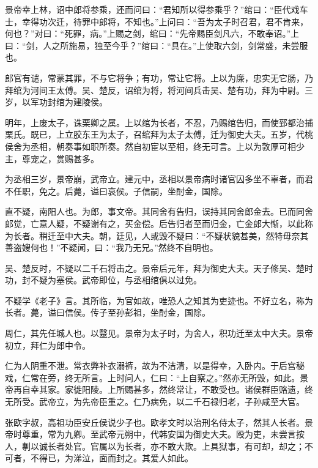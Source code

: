 \documentclass[12pt,UTF8]{ctexbook}
\begin{document}
景帝幸上林，诏中郎将参乘，还而问曰：“君知所以得参乘乎？”绾曰：“臣代戏车士，幸得功次迁，待罪中郎将，不知也。”上问曰：“吾为太子时召君，君不肯来，何也？”对曰：“死罪，病。”上赐之剑，绾曰：“先帝赐臣剑凡六，不敢奉诏。”上曰：“剑，人之所施易，独至今乎？”绾曰：“具在。”上使取六剑，剑常盛，未尝服也。



郎官有谴，常蒙其罪，不与它将争；有功，常让它将。上以为廉，忠实无它肠，乃拜绾为河间王太傅。吴、楚反，诏绾为将，将河间兵击吴、楚有功，拜为中尉。三岁，以军功封绾为建陵侯。



明年，上废太子，诛栗卿之属。上以绾为长者，不忍，乃赐绾告归，而使郅都治捕栗氏。既已，上立胶东王为太子，召绾拜为太子太傅，迁为御史大夫。五岁，代桃侯舍为丞相，朝奏事如职所奏。然自初宦以至相，终无可言。上以为敦厚可相少主，尊宠之，赏赐甚多。



为丞相三岁，景帝崩，武帝立。建元中，丞相以景帝病时诸官囚多坐不辜者，而君不任职，免之。后薨，谥曰哀侯。子信嗣，坐酎金，国除。



直不疑，南阳人也。为郎，事文帝。其同舍有告归，误持其同舍郎金去。已而同舍郎觉，亡意人疑，不疑谢有之，买金偿。后告归者至而归金，亡金郎大惭，以此称为长者。稍迁至中大夫。朝，廷见，人或毁不疑曰：“不疑状貌甚美，然特毋奈其善盗嫂何也！”不疑闻，曰：“我乃无兄。”然终不自明也。



吴、楚反时，不疑以二千石将击之。景帝后元年，拜为御史大夫。天子修吴、楚时功，封不疑为塞侯。武帝即位，与丞相绾俱以过免。



不疑学《老子》言。其所临，为官如故，唯恐人之知其为吏迹也。不好立名，称为长者。薨，谥曰信侯。传子至孙彭祖，坐酎金，国除。



周仁，其先任城人也。以毉见。景帝为太子时，为舍人，积功迁至太中大夫。景帝初立，拜仁为郎中令。



仁为人阴重不泄。常衣弊补衣溺裤，故为不洁清，以是得幸，入卧内。于后宫秘戏，仁常在旁，终无所言。上时问人，仁曰：“上自察之。”然亦无所毁，如此。景帝再自幸其家。家徙阳陵。上所赐甚多，然终常让，不敢受也。诸侯群臣赂遗，终无所受。武帝立，为先帝臣重之。仁乃病免，以二千石禄归老，子孙咸至大官。



张欧字叔，高祖功臣安丘侯说少子也。欧孝文时以治刑名侍太子，然其人长者。景帝时尊重，常为九卿。至武帝元朔中，代韩安国为御史大夫。殴为吏，未尝言按人，剸以诚长者处官。官属以为长者，亦不敢大欺。上具狱事，有可却，却之；不可者，不得已，为涕泣，面而封之。其爱人如此。
\end{document}
